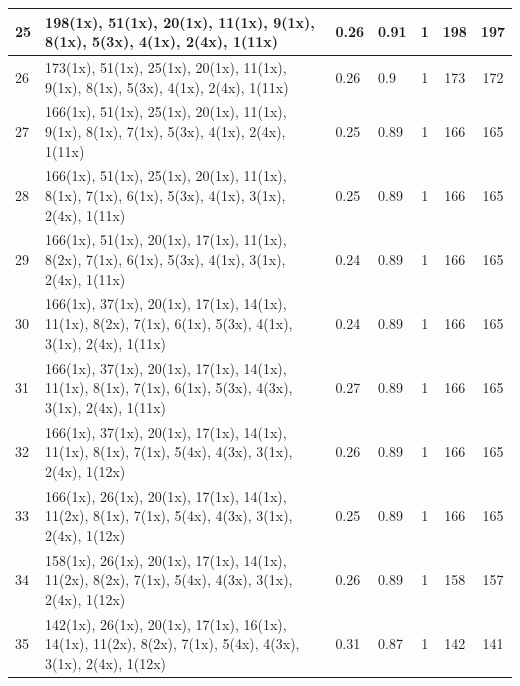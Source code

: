 \begin{small}
\begin{longtable}{|p{0.5cm}|p{9cm}|p{1.3cm}|p{1.3cm}|c|c|c|}
  25 & 198(1x), 51(1x), 20(1x), 11(1x), 9(1x), 8(1x), 5(3x), 4(1x), 2(4x), 1(11x) & \cellcolor{colorGood}  0.26 & \cellcolor{colorGood} 0.91 & 1 & 198 & \cellcolor{colorBad} 197 \\   \hline
  26 & 173(1x), 51(1x), 25(1x), 20(1x), 11(1x), 9(1x), 8(1x), 5(3x), 4(1x), 2(4x), 1(11x) & \cellcolor{colorGood}  0.26 & \cellcolor{colorGood} 0.9 & 1 & 173 & \cellcolor{colorBad} 172 \\   \hline
  27 & 166(1x), 51(1x), 25(1x), 20(1x), 11(1x), 9(1x), 8(1x), 7(1x), 5(3x), 4(1x), 2(4x), 1(11x) & \cellcolor{colorGood}  0.25 & \cellcolor{colorGood} 0.89 & 1 & 166 & \cellcolor{colorBad} 165 \\   \hline
  28 & 166(1x), 51(1x), 25(1x), 20(1x), 11(1x), 8(1x), 7(1x), 6(1x), 5(3x), 4(1x), 3(1x), 2(4x), 1(11x) & \cellcolor{colorGood}  0.25 & \cellcolor{colorGood} 0.89 & 1 & 166 & \cellcolor{colorBad} 165 \\   \hline
  29 & 166(1x), 51(1x), 20(1x), 17(1x), 11(1x), 8(2x), 7(1x), 6(1x), 5(3x), 4(1x), 3(1x), 2(4x), 1(11x) & \cellcolor{colorGood}  0.24 & \cellcolor{colorGood} 0.89 & 1 & 166 & \cellcolor{colorBad} 165 \\   \hline
  30 & 166(1x), 37(1x), 20(1x), 17(1x), 14(1x), 11(1x), 8(2x), 7(1x), 6(1x), 5(3x), 4(1x), 3(1x), 2(4x), 1(11x) & \cellcolor{colorGood}  0.24 & \cellcolor{colorGood} 0.89 & 1 & 166 & \cellcolor{colorBad} 165 \\   \hline
  31 & 166(1x), 37(1x), 20(1x), 17(1x), 14(1x), 11(1x), 8(1x), 7(1x), 6(1x), 5(3x), 4(3x), 3(1x), 2(4x), 1(11x) & \cellcolor{colorGood}  0.27 & \cellcolor{colorGood} 0.89 & 1 & 166 & \cellcolor{colorBad} 165 \\   \hline
  32 & 166(1x), 37(1x), 20(1x), 17(1x), 14(1x), 11(1x), 8(1x), 7(1x), 5(4x), 4(3x), 3(1x), 2(4x), 1(12x) & \cellcolor{colorGood}  0.26 & \cellcolor{colorGood} 0.89 & 1 & 166 & \cellcolor{colorBad} 165 \\   \hline
  33 & 166(1x), 26(1x), 20(1x), 17(1x), 14(1x), 11(2x), 8(1x), 7(1x), 5(4x), 4(3x), 3(1x), 2(4x), 1(12x) & \cellcolor{colorGood}  0.25 & \cellcolor{colorGood} 0.89 & 1 & 166 & \cellcolor{colorBad} 165 \\   \hline
  34 & 158(1x), 26(1x), 20(1x), 17(1x), 14(1x), 11(2x), 8(2x), 7(1x), 5(4x), 4(3x), 3(1x), 2(4x), 1(12x) & \cellcolor{colorGood}  0.26 & \cellcolor{colorGood} 0.89 & 1 & 158 & \cellcolor{colorBad} 157 \\   \hline
  35 & 142(1x), 26(1x), 20(1x), 17(1x), 16(1x), 14(1x), 11(2x), 8(2x), 7(1x), 5(4x), 4(3x), 3(1x), 2(4x), 1(12x) & \cellcolor{colorGood}  0.31 & \cellcolor{colorGood} 0.87 & 1 & 142 & \cellcolor{colorBad} 141 \\   \hline

\end{longtable}
\end{small}
